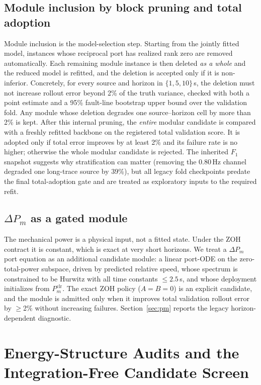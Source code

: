 \documentclass[journal]{IEEEtran}
\begin{document}
\subsection{Module inclusion by block pruning and total adoption}
\label{sec:prune}
Module inclusion is the model-selection step. Starting from the jointly fitted
model, instances whose reciprocal port has realized rank zero are removed
automatically. Each remaining module instance is then deleted \emph{as a whole}
and the reduced model is refitted, and the deletion is accepted only if it is
non-inferior. Concretely, for every source and horizon in
$\{1,5,10\}$\,s, the deletion must not increase rollout error beyond 2\% of the
truth variance, checked with both a point estimate and a 95\% fault-line
bootstrap upper bound over the validation fold. Any module whose deletion
degrades one source--horizon cell by more than 2\% is kept. After this internal
pruning, the \emph{entire} modular candidate is compared with a freshly refitted
backbone on the registered total validation score. It is adopted only if total
error improves by at least 2\% and its failure rate is no higher; otherwise the
whole modular candidate is rejected. The inherited $F_1$ snapshot suggests why
stratification can matter (removing the 0.80\,Hz channel degraded one long-trace
source by 39\%), but all legacy fold checkpoints predate the final total-adoption
gate and are treated as exploratory inputs to the required refit.

\subsection{$\Delta P_m$ as a gated module}
The mechanical power is a physical input, not a fitted state. Under the ZOH
contract it is constant, which is exact at very short horizons. We treat a
$\Delta P_m$ port equation as an additional candidate module: a linear
port-ODE on the zero-total-power subspace, driven by predicted relative speed,
whose spectrum is constrained to be Hurwitz with all time constants
$\leq 2.5$\,s, and whose deployment initializes from $P_m^{\mathrm{clr}}$. The
exact ZOH policy ($A{=}B{=}0$) is an explicit candidate, and the module is
admitted only when it improves total validation rollout error by $\geq$2\%
without increasing failures. Section~\ref{sec:pm} reports the legacy
horizon-dependent diagnostic.

\section{Energy-Structure Audits and the
Integration-Free Candidate Screen}
\label{sec:energy}
\end{document}
